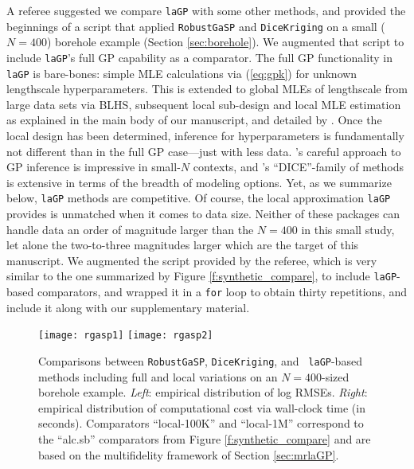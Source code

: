 \documentclass[12pt]{article}
\begin{document}
A referee suggested we compare {\tt laGP} with some other methods, and
provided the beginnings of a script that applied {\tt RobustGaSP}
\citep{gu:etal:2018} and {\tt DiceKriging} \citep{roustant:etal:2012} on a
small ($N=400$) borehole example (Section \ref{sec:borehole}).  We augmented
that script to include {\tt laGP}'s full GP capability as a comparator.  The
full GP functionality in {\tt laGP} is bare-bones: simple MLE calculations via
(\ref{eq:gpk}) for unknown lengthscale hyperparameters.  This is extended to
global MLEs of lengthscale from large data sets via BLHS, subsequent local
sub-design and local MLE estimation as explained in the main body of our
manuscript, and detailed by \citet{gramacy:apley:2015}.  Once the local design
has been determined, inference for hyperparameters is fundamentally not
different than in the full GP case---just with less data.
\citeauthor{gu:etal:2018}'s careful approach to GP inference is impressive in
small-$N$ contexts, and \citeauthor{roustant:etal:2012}'s ``DICE''-family of
methods is extensive in terms of the breadth of modeling options. Yet, as we
summarize below, {\tt laGP} methods are competitive.  Of course, the local
approximation {\tt laGP} provides is unmatched when it comes to data size.
Neither of these packages can handle data an order of magnitude larger than
the $N=400$ in this small study, let alone the two-to-three magnitudes larger
which are the target of this manuscript.  We augmented the script provided by
the referee, which is very similar to the one summarized by Figure
\ref{f:synthetic_compare}, to include {\tt laGP}-based comparators, and
wrapped it in a {\tt for} loop to obtain thirty repetitions, and include it
along with our supplementary material.

\begin{figure}[ht!]
\centering
\texttt{[image: rgasp1]} \hspace{0.5cm}
\texttt{[image: rgasp2]}
\caption{Comparisons between {\tt RobustGaSP}, {\tt DiceKriging}, and {\tt
laGP}-based methods including full and local variations on an $N=400$-sized
borehole example. {\em Left}: empirical distribution of log RMSEs. {\em
Right}: empirical distribution of computational cost via wall-clock time (in
seconds). Comparators ``local-100K'' and ``local-1M'' correspond to the
``alc.sb'' comparators from Figure \ref{f:synthetic_compare} and are based on
the multifidelity framework of Section \ref{sec:mrlaGP}.}
\label{f:rgasp}
\end{figure}
\end{document}
